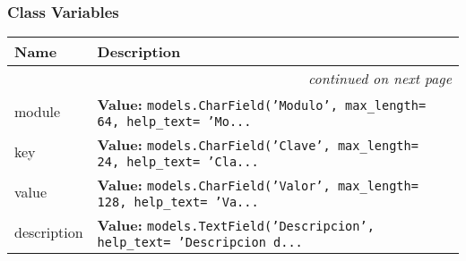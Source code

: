 
  \subsubsection{Class Variables}

    \vspace{-1cm}
\hspace{\varindent}\begin{longtable}{|p{\varnamewidth}|p{\vardescrwidth}|l}
\cline{1-2}
\cline{1-2} \centering \textbf{Name} & \centering \textbf{Description}& \\
\cline{1-2}
\endhead\cline{1-2}\multicolumn{3}{r}{\small\textit{continued on next page}}\\\endfoot\cline{1-2}
\endlastfoot\raggedright m\-o\-d\-u\-l\-e\- & \raggedright \textbf{Value:} 
{\tt models.CharField('Modulo', max\_length= 64, help\_text= 'Mo\texttt{...}}&\\
\cline{1-2}
\raggedright k\-e\-y\- & \raggedright \textbf{Value:} 
{\tt models.CharField('Clave', max\_length= 24, help\_text= 'Cla\texttt{...}}&\\
\cline{1-2}
\raggedright v\-a\-l\-u\-e\- & \raggedright \textbf{Value:} 
{\tt models.CharField('Valor', max\_length= 128, help\_text= 'Va\texttt{...}}&\\
\cline{1-2}
\raggedright d\-e\-s\-c\-r\-i\-p\-t\-i\-o\-n\- & \raggedright \textbf{Value:} 
{\tt models.TextField('Descripcion', help\_text= 'Descripcion d\texttt{...}}&\\
\cline{1-2}
\end{longtable}

